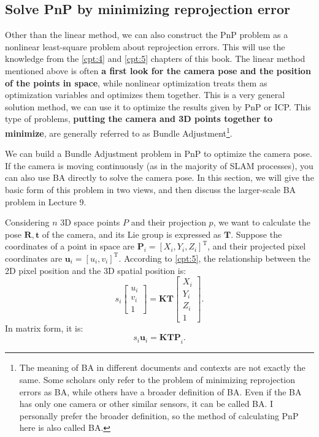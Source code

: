 \subsection{Solve PnP by minimizing reprojection error}
\label{sec:BA-vo1}
Other than the linear method, we can also construct the PnP problem as a nonlinear least-square problem about reprojection errors. This will use the knowledge from the \ref{cpt:4} and \ref{cpt:5} chapters of this book. The linear method mentioned above is often \textbf{a first look for the camera pose and the position of the points in space}, while nonlinear optimization treats them as optimization variables and optimizes them together. This is a very general solution method, we can use it to optimize the results given by PnP or ICP. This type of problems, \textbf{putting the camera and 3D points together to minimize}, are generally referred to as Bundle Adjustment\footnote{The meaning of BA in different documents and contexts are not exactly the same. Some scholars only refer to the problem of minimizing reprojection errors as BA, while others have a broader definition of BA. Even if the BA has only one camera or other similar sensors, it can be called BA. I personally prefer the broader definition, so the method of calculating PnP here is also called BA.}.

We can build a Bundle Adjustment problem in PnP to optimize the camera pose. If the camera is moving continuously (as in the majority of SLAM processes), you can also use BA directly to solve the camera pose. In this section, we will give the basic form of this problem in two views, and then discuss the larger-scale BA problem in Lecture 9.

Considering $n$ 3D space points $P$ and their projection $p$, we want to calculate the pose $\mathbf{R}, \mathbf{t}$ of the camera, and its Lie group is expressed as $\mathbf{T}$. Suppose the coordinates of a point in space are $\mathbf{P}_i=[X_i,Y_i,Z_i]^\mathrm{T}$, and their projected pixel coordinates are $\mathbf{u}_i=[u_i,v_i]^ \mathrm{T}$. According to \ref{cpt:5}, the relationship between the 2D pixel position and the 3D spatial position is:
\begin{equation}
s_i \left[ 
\begin{array}{l}
u_i \\ v_i \\ 1
\end{array}
\right] = \mathbf{K} \mathbf{T} \left[ 
\begin{array}{l}
X_i \\ Y_i \\ Z_i \\ 1
\end{array} \right]  .
\end{equation}
In matrix form, it is:
\[
{{s_i {\mathbf{u}}_i} = \mathbf{K} \mathbf{T} \mathbf{P}}_i.
\]

